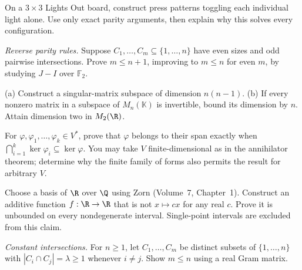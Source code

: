 \begin{exercise}[$\star\star$]\label{linear:ex:lights3}
On a $3\times3$ Lights Out board, construct press patterns toggling each individual light alone. Use only exact parity arguments, then explain why this solves every configuration.
\end{exercise}
\begin{exercise}[$\star\star$]\label{linear:ex:eventown}
\emph{Reverse parity rules.} Suppose $C_1,\ldots,C_m\subseteq\{1,\ldots,n\}$ have even sizes and odd pairwise intersections. Prove $m\le n+1$, improving to $m\le n$ for even $m$, by studying $J-I$ over $\mathbb F_2$.
\end{exercise}
\begin{exercise}[$\star\star$]\label{linear:ex:singularspace}
(a) Construct a singular-matrix subspace of dimension $n(n-1)$. (b) If every nonzero matrix in a subspace of $M_n(\mathbb K)$ is invertible, bound its dimension by $n$. Attain dimension two in $M_2(\R)$.
\end{exercise}
\begin{exercise}[$\star\star$]\label{linear:ex:hyperplanes}
For $\varphi,\varphi_1,\ldots,\varphi_k\in V^*$, prove that $\varphi$ belongs to their span exactly when $\bigcap_{i=1}^k\ker\varphi_i\subseteq\ker\varphi$. You may take $V$ finite-dimensional as in the annihilator theorem; determine why the finite family of forms also permits the result for arbitrary $V$.
\end{exercise}
\begin{exercise}[$\star\star\star$]\label{linear:ex:hamel}
Choose a basis of $\R$ over $\Q$ using Zorn (Volume~7, Chapter~1). Construct an additive function $f:\R\to\R$ that is not $x\mapsto cx$ for any real $c$. Prove it is unbounded on every nondegenerate interval. Single-point intervals are excluded from this claim.
\end{exercise}
\begin{exercise}[$\star\star\star$]\label{linear:ex:fisher}
\emph{Constant intersections.} For $n\ge1$, let $C_1,\ldots,C_m$ be distinct subsets of $\{1,\ldots,n\}$ with $|C_i\cap C_j|=\lambda\ge1$ whenever $i\ne j$. Show $m\le n$ using a real Gram matrix.
\end{exercise}

